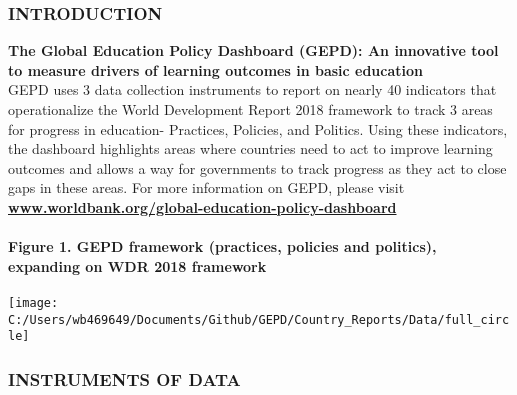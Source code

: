\documentclass[
  twocolumn]{article}
\author{}
\date{\vspace{-2.5em}}
\begin{document}
\newcommand{\greynote}[1]{
    {\scriptsize
    \textcolor{darkgray}{\textit{Notes:} #1}
  }
}

\newcommand{\greysource}[1]{
    {\scriptsize
    \textcolor{darkgray}{\textit{Source:} #1}
  }
}

\newcommand{\greydisclaimer}[1]{
    {\scriptsize
    \textcolor{darkgray}{\textit{Disclaimer:} #1}
  }
}

\newcommand*{\tabindent}{\hspace{1mm}}

\hypertarget{introduction}{%
\subsubsection{\texorpdfstring{\textbf{INTRODUCTION}}{INTRODUCTION}}\label{introduction}}

\textbf{The Global Education Policy Dashboard (GEPD): An innovative tool
to measure drivers of learning outcomes in basic education}\\
GEPD uses 3 data collection instruments to report on nearly 40
indicators that operationalize the World Development Report 2018
framework to track 3 areas for progress in education- Practices,
Policies, and Politics. Using these indicators, the dashboard highlights
areas where countries need to act to improve learning outcomes and
allows a way for governments to track progress as they act to close gaps
in these areas. For more information on GEPD, please visit
\textbf{\href{https://www.worldbank.org/en/topic/education/brief/global-education-policy-dashboard}{www.worldbank.org/global-education-policy-dashboard}}

\hypertarget{figure-1.-gepd-framework-practices-policies-and-politics-expanding-on-wdr-2018-framework}{%
\paragraph{Figure 1. GEPD framework (practices, policies and politics),
expanding on WDR 2018
framework}\label{figure-1.-gepd-framework-practices-policies-and-politics-expanding-on-wdr-2018-framework}}

\begin{center}\texttt{[image: C:/Users/wb469649/Documents/Github/GEPD/Country\_Reports/Data/full\_circle]} \end{center}

\hypertarget{instruments-of-data}{%
\subsubsection{\texorpdfstring{\textbf{INSTRUMENTS OF
DATA}}{INSTRUMENTS OF DATA}}\label{instruments-of-data}}
\end{document}
